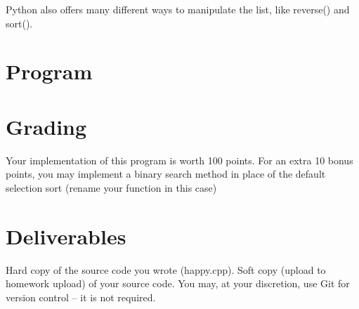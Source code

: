 \documentclass[letterpaper,12pt]{article}
\begin{document}
Python also offers many different ways to manipulate the list, like reverse() and sort().






\section*{Program}

\section*{Grading}
Your implementation of this program is worth 100 points. For an extra 10 bonus points,
you may implement a binary search method in place of the default selection sort (rename your function in this case)


\section*{Deliverables}
Hard copy of the source code you wrote (happy.cpp). Soft copy (upload to homework upload) of
your source code. You may, at your discretion, use Git for version control -- it is not required.

\end{document}
